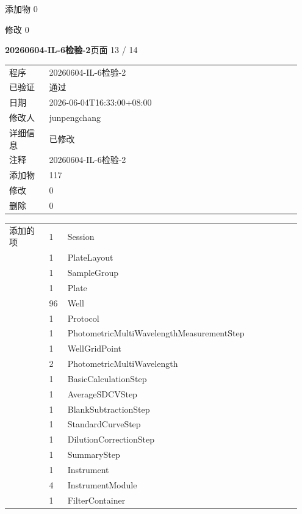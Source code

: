 \documentclass[UTF8,10pt,a4paper,fontset=fandol]{ctexart}
\newcommand{\fieldvalue}[1]{#1}
\begin{document}
\noindent
添加物\hspace{2em}
\fieldvalue{0}

\noindent
修改\hspace{2em}
\fieldvalue{0}


\newpage

\noindent\textbf{20260604-IL-6检验-2}\hfill 页面 13 / 14

\vspace{0.5em}

\begin{flushleft}
\small
\begin{tabular}{@{}p{0.13\linewidth}p{0.82\linewidth}@{}}
程序 & 20260604-IL-6检验-2\\
已验证 & 通过\\
日期 & 2026-06-04T16:33:00+08:00\\
修改人 & junpengchang\\
详细信息 & 已修改\\
注释 & 20260604-IL-6检验-2\\[0.3em]
添加物 & 117\\
修改 & 0\\
删除 & 0\\
\end{tabular}

\vspace{0.3em}

\begin{tabular}{@{}p{0.13\linewidth}p{0.06\linewidth}p{0.76\linewidth}@{}}
添加的项 & 1 & Session\\
& 1 & PlateLayout\\
& 1 & SampleGroup\\
& 1 & Plate\\
& 96 & Well\\
& 1 & Protocol\\
& 1 & PhotometricMultiWavelengthMeasurementStep\\
& 1 & WellGridPoint\\
& 2 & PhotometricMultiWavelength\\
& 1 & BasicCalculationStep\\
& 1 & AverageSDCVStep\\
& 1 & BlankSubtractionStep\\
& 1 & StandardCurveStep\\
& 1 & DilutionCorrectionStep\\
& 1 & SummaryStep\\
& 1 & Instrument\\
& 4 & InstrumentModule\\
& 1 & FilterContainer\\
\end{tabular}


\end{flushleft}
\end{document}
